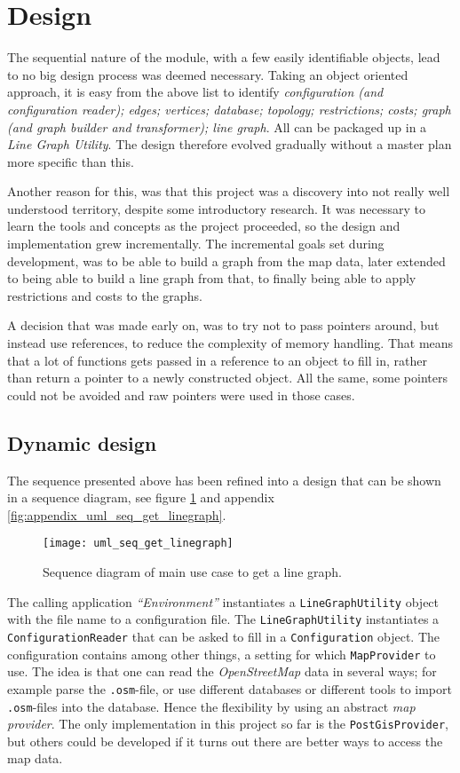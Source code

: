 \documentclass[../main.tex]{subfiles}
\begin{document}
\section{Design}
The sequential nature of the module, with a few easily identifiable objects, lead to no big design process was deemed necessary. Taking an object oriented approach, it is easy from the above list to identify \textit{configuration (and configuration reader); edges; vertices; database; topology; restrictions; costs; graph (and graph builder and transformer); line graph}. All can be packaged up in a \textit{Line Graph Utility}. The design therefore evolved gradually without a master plan more specific than this.

Another reason for this, was that this project was a discovery into not really well understood territory, despite some introductory research. It was necessary to learn the tools and concepts as the project proceeded, so the design and implementation grew incrementally. The incremental goals set during development, was to be able to build a graph from the map data, later extended to being able to build a line graph from that, to finally being able to apply restrictions and costs to the graphs.

A decision that was made early on, was to try not to pass pointers around, but instead use references, to reduce the complexity of memory handling. That means that a lot of functions gets passed in a reference to an object to fill in, rather than return a pointer to a newly constructed object. All the same, some pointers could not be avoided and raw pointers were used in those cases.

\subsection{Dynamic design}\label{linegraph-sequence}
The sequence presented above has been refined into a design that can be shown in a sequence diagram, see figure \ref{fig:uml_seq_get_linegraph} and appendix \ref{fig:appendix_uml_seq_get_linegraph}.

\begin{figure}[h]
    \centering
    \texttt{[image: uml\_seq\_get\_linegraph]}
    \caption{Sequence diagram of main use case to get a line graph.}
    \label{fig:uml_seq_get_linegraph}
\end{figure}

The calling application \textit{``Environment''} instantiates a \texttt{LineGraphUtility} object with the file name to a configuration file. The \texttt{LineGraphUtility} instantiates a \texttt{ConfigurationReader} that can be asked to fill in a \texttt{Configuration} object. The configuration contains among other things, a setting for which \texttt{MapProvider} to use. The idea is that one can read the \textit{OpenStreetMap} data in several ways; for example parse the \texttt{.osm}-file, or use different databases or different tools to import \texttt{.osm}-files into the database. Hence the flexibility by using an abstract \textit{map provider}. The only implementation in this project so far is the \texttt{PostGisProvider}, but others could be developed if it turns out there are better ways to access the map data.
\end{document}

